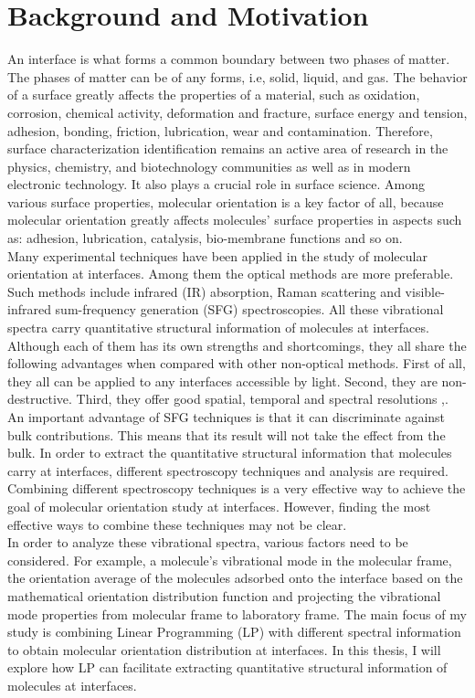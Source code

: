  \label{ch:1}
\section{Background and Motivation}
An interface is what forms a common boundary between two phases of matter. The phases of matter can be of any forms, i.e, solid, liquid, and gas. The behavior of a surface greatly affects the properties of a material, such as oxidation, corrosion, chemical activity, deformation and fracture, surface energy and tension, adhesion, bonding, friction, lubrication, wear and contamination. Therefore, surface characterization identification remains an active area of research in the physics, chemistry, and biotechnology communities as well as in modern electronic technology. It also plays a crucial role in surface science. Among various surface properties, molecular orientation is a key factor of all, because molecular orientation greatly affects molecules' surface properties in aspects such as: adhesion, lubrication, catalysis, bio-membrane functions and so on. \cite{PhysRevB.59.12632}\\

Many experimental techniques have been applied in the study of molecular orientation at interfaces. Among them the optical methods are more preferable. Such methods include infrared (IR) absorption, Raman scattering and visible-infrared sum-frequency generation (SFG) spectroscopies. All these vibrational spectra carry quantitative structural information of molecules at interfaces. Although each of them has its own strengths and shortcomings, they all share the following advantages when compared with other non-optical methods. First of all, they all can be applied to any interfaces accessible by light. Second, they are non-destructive. Third, they offer good spatial, temporal and spectral resolutions \cite{Brasselet:11},\cite{PhysRevB.59.12632}. An important advantage of SFG techniques is that it can discriminate against bulk contributions. This means that its result will not take the effect from the bulk. In order to extract the quantitative structural information that molecules carry at interfaces, different spectroscopy techniques and analysis are required. Combining different spectroscopy techniques is a very effective way to achieve the goal of molecular orientation study at interfaces. However, finding the most effective ways to combine these techniques may not be clear.\\

In order to analyze these vibrational spectra, various factors need to be considered. For example, a molecule's vibrational mode in the molecular frame, the orientation average of the molecules adsorbed onto the interface based on the mathematical orientation distribution function and projecting the vibrational mode properties from molecular frame to laboratory frame. The main focus of my study is combining Linear Programming (LP) with different spectral information to obtain molecular orientation distribution at interfaces. In this thesis, I will explore how LP can facilitate extracting quantitative structural information of molecules at interfaces.\\

